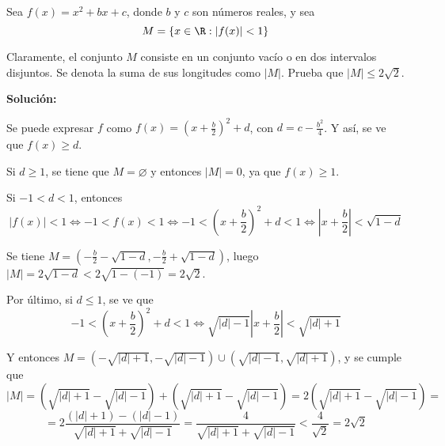 \documentclass[../../main.tex]{subfiles}
\begin{document}
  \begin{shaded}
    Sea $f(x) = x^2 + b x + c$, donde $b$ y $c$ son números reales, y sea
    $$
    M = \{x \in \R : |f(x)| < 1\}
    $$

    Claramente, el conjunto $M$ consiste en un conjunto vacío o en dos intervalos disjuntos. Se denota la suma de sus longitudes como $|M|$. Prueba que $|M| \leq 2 \sqrt{2}$.
  \end{shaded}

  \textbf{Solución:}

  Se puede expresar $f$ como $f(x) = \left(x + \displaystyle\frac{b}{2}\right)^2 + d$, con $d = c - \displaystyle\frac{b^2}{4}$. Y así, se ve que $f(x) \geq d$.

  Si $d \geq 1$, se tiene que $M = \varnothing$ y entonces $|M| = 0$, ya que $f(x) \geq 1$.

  Si $-1 < d < 1$, entonces 
  $$
  |f(x)| < 1 \iff -1 < f(x) < 1 \iff -1 < \left(x + \displaystyle\frac{b}{2}\right)^2 + d < 1 \iff \left|x + \frac{b}{2}\right| < \sqrt{1 - d}
  $$

  Se tiene $M = \left(-\frac{b}{2} - \sqrt{1 - d}, -\frac{b}{2} + \sqrt{1 - d}\right)$, luego $|M| = 2\sqrt{1 - d} < 2 \sqrt{1 - (-1)} = 2\sqrt{2}$.

  Por último, si $d \leq 1$, se ve que 
  $$
  -1 < \left(x + \displaystyle\frac{b}{2}\right)^2 + d < 1 \iff \sqrt{|d| - 1}\left|x + \frac{b}{2}\right| < \sqrt{|d| + 1}
  $$

  Y entonces $M = (-\sqrt{|d| + 1}, -\sqrt{|d| - 1}) \cup (\sqrt{|d| - 1}, \sqrt{|d| + 1})$, y se cumple que
  $$
  |M| = (\sqrt{|d| + 1} - \sqrt{|d| - 1}) + (\sqrt{|d| + 1} - \sqrt{|d| - 1}) = 2 (\sqrt{|d| + 1} - \sqrt{|d| - 1}) =
  $$
  $$
  = 2 \frac{(|d| + 1) - (|d| - 1)}{\sqrt{|d| + 1} + \sqrt{|d| - 1}} = \frac{4}{\sqrt{|d| + 1} + \sqrt{|d| - 1}} < \frac{4}{\sqrt{2}} = 2 \sqrt{2}
  $$
\end{document}
